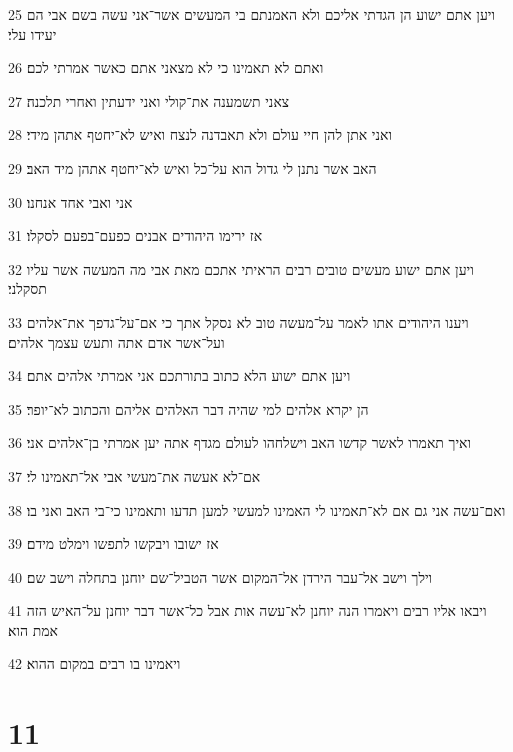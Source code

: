 \par 25 ויען אתם ישוע הן הגדתי אליכם ולא האמנתם בי המעשים אשר־אני עשה בשם אבי הם יעידו עלי׃
\par 26 ואתם לא תאמינו כי לא מצאני אתם כאשר אמרתי לכם׃
\par 27 צאני תשמענה את־קולי ואני ידעתין ואחרי תלכנה׃
\par 28 ואני אתן להן חיי עולם ולא תאבדנה לנצח ואיש לא־יחטף אתהן מידי׃
\par 29 האב אשר נתנן לי גדול הוא על־כל ואיש לא־יחטף אתהן מיד האב׃
\par 30 אני ואבי אחד אנחנו׃
\par 31 אז ירימו היהודים אבנים כפעם־בפעם לסקלו׃
\par 32 ויען אתם ישוע מעשים טובים רבים הראיתי אתכם מאת אבי מה המעשה אשר עליו תסקלני׃
\par 33 ויענו היהודים אתו לאמר על־מעשה טוב לא נסקל אתך כי אם־על־גדפך את־אלהים ועל־אשר אדם אתה ותעש עצמך אלהים׃
\par 34 ויען אתם ישוע הלא כתוב בתורתכם אני אמרתי אלהים אתם׃
\par 35 הן יקרא אלהים למי שהיה דבר האלהים אליהם והכתוב לא־יופר׃
\par 36 ואיך תאמרו לאשר קדשו האב וישלחהו לעולם מגדף אתה יען אמרתי בן־אלהים אני׃
\par 37 אם־לא אעשה את־מעשי אבי אל־תאמינו לי׃
\par 38 ואם־עשה אני גם אם לא־תאמינו לי האמינו למעשי למען תדעו ותאמינו כי־בי האב ואני בו׃
\par 39 אז ישובו ויבקשו לתפשו וימלט מידם׃
\par 40 וילך וישב אל־עבר הירדן אל־המקום אשר הטביל־שם יוחנן בתחלה וישב שם׃
\par 41 ויבאו אליו רבים ויאמרו הנה יוחנן לא־עשה אות אבל כל־אשר דבר יוחנן על־האיש הזה אמת הוא׃
\par 42 ויאמינו בו רבים במקום ההוא׃

\chapter{11}

